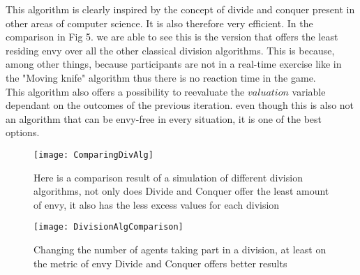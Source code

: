 This algorithm is clearly inspired by the concept of divide and conquer present in other areas of computer science. It is also therefore very efficient. In the comparison in Fig 5. we are able to see this is the version that offers the least residing envy over all the other classical division algorithms. This is because, among other things, because participants are not in a real-time exercise like in the "Moving knife" algorithm thus there is no reaction time in the game.\\
This algorithm also offers a possibility to reevaluate the $valuation$ variable dependant on the outcomes of the previous iteration. even though this is also not an algorithm that can be envy-free in every situation, it is one of the best options.
\begin{figure}
  \begin{center}
    \begin{minipage}[b]{0.4\textwidth}
      \texttt{[image: ComparingDivAlg]}
      \caption{Here is a comparison result of a simulation of different division algorithms, not only does Divide and Conquer offer the least amount of envy, it also has the less excess values for each division}
      \protect\cite{Lang09}
    \end{minipage}
    \hfill
  \begin{minipage}[b]{0,4\textwidth}
    \texttt{[image: DivisionAlgComparison]}
    \caption{Changing the number of agents taking part in a division, at least on the metric of envy Divide and Conquer offers better results \cite{Lang09}}
  \end{minipage}
  \end{center}
\end{figure}







